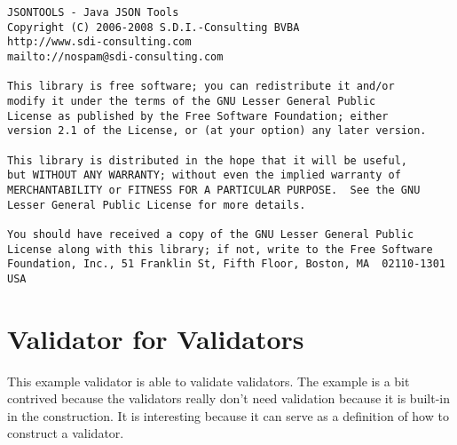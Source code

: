 \documentclass[a4paper]{article}
\begin{document}
\begin{verbatim}
JSONTOOLS - Java JSON Tools
Copyright (C) 2006-2008 S.D.I.-Consulting BVBA
http://www.sdi-consulting.com
mailto://nospam@sdi-consulting.com

This library is free software; you can redistribute it and/or
modify it under the terms of the GNU Lesser General Public
License as published by the Free Software Foundation; either
version 2.1 of the License, or (at your option) any later version.

This library is distributed in the hope that it will be useful,
but WITHOUT ANY WARRANTY; without even the implied warranty of
MERCHANTABILITY or FITNESS FOR A PARTICULAR PURPOSE.  See the GNU
Lesser General Public License for more details.

You should have received a copy of the GNU Lesser General Public
License along with this library; if not, write to the Free Software
Foundation, Inc., 51 Franklin St, Fifth Floor, Boston, MA  02110-1301  USA 
\end{verbatim}

\newpage
\section{ Validator for Validators }

 This example validator is able to validate validators. The example is a bit contrived because the validators really don't need validation because it is built-in in the construction. It is interesting because it can serve as a definition of how to construct a validator.
 
\end{document}

